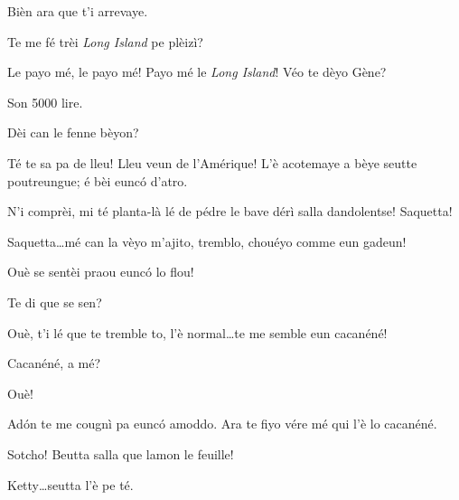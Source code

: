 \begin{drama}
\Selmospeaks Bièn ara que t'i arrevaye.

\Kettyspeaks {} Te me fé trèi \textit{Long Island} pe plèizì?


\Selmospeaks Le payo mé, le payo mé! Payo mé le \textit{Long Island}! Véo te dèyo Gène?

\Genespeaks Son 5000 lire.


\Walterspeaks{} Dèi can le fenne bèyon?

\Selmospeaks Té te sa pa de lleu! Lleu veun de l'Amérique! L'è acotemaye a bèye seutte poutreungue; é bèi eunc\'o d'atro.


\Walterspeaks	N'i comprèi, mi té planta-là lé de pédre le bave dérì salla dandolentse! Saquetta!

\Selmospeaks{} Saquetta\ldots mé can la vèyo m'ajito, tremblo, chouéyo comme eun gadeun!

\Walterspeaks	Ouè se sentèi praou eunc\'o lo flou!

\Selmospeaks{} Te di que se sen?

\Walterspeaks Ouè, t'i lé que te tremble to, l'è normal\ldots te me semble eun cacanéné!

\Selmospeaks{} Cacanéné, a mé? 	

\Walterspeaks Ouè!

\Selmospeaks Ad\'on te me cougnì pa eunc\'o amoddo. Ara te fiyo vére mé qui l'è lo cacanéné.


\Selmospeaks{} Sotcho! Beutta salla que lamon le feuille!


\Selmospeaks Ketty\ldots seutta l'è pe té.

\end{drama}
